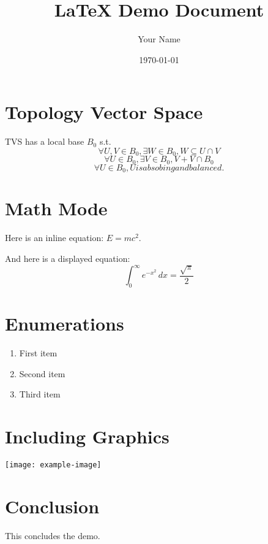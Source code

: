 \documentclass{article}
\title{LaTeX Demo Document}
\author{Your Name}
\date{\today}
\begin{document}
\maketitle

\section{Topology Vector Space}
TVS has a local base $B_0$ s.t. 
\[ \forall U, V \in B_{0}, \exists W \in B_{0}, W \subseteq U \cap V \]
\[ \forall U \in B_{0}, \exists V \in B_{0}, V + V \cap B_{0 }\]
\[ \forall U \in B_{0}, U is absobing and balanced.\]

\section{Math Mode}
Here is an inline equation: \( E = mc^2 \).

And here is a displayed equation:
\[
\int_{0}^{\infty} e^{-x^2} \, dx = \frac{\sqrt{\pi}}{2}
\]

\section{Enumerations}
\begin{enumerate}
  \item First item
  \item Second item
  \item Third item
\end{enumerate}

\section{Including Graphics}
\begin{center}
\texttt{[image: example-image]}
\end{center}

\section{Conclusion}
This concludes the demo.
\end{document}
